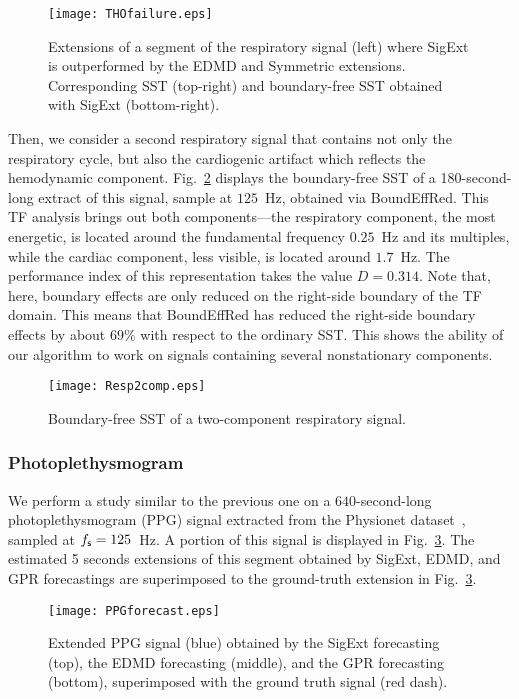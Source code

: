 \begin{figure}
\centering
\texttt{[image: THOfailure.eps]}
\caption{Extensions of a segment of the respiratory signal (left) where {\sf SigExt} is outperformed by the EDMD and Symmetric extensions. Corresponding SST (top-right) and boundary-free SST obtained with {\sf SigExt} (bottom-right).}
\label{fig:THO.failure}
\end{figure} 

{\color{red}
Then, we consider a second respiratory signal that contains not only the respiratory cycle, but also the cardiogenic artifact which reflects the hemodynamic component. Fig.~\ref{fig:resp.2} displays the boundary-free SST of a 180-second-long extract of this signal, sample at $125$~Hz, obtained via {\sf BoundEffRed}. This TF analysis brings out both components---the respiratory component, the most energetic, is located around the fundamental frequency $0.25$~Hz and its multiples, while the cardiac component, less visible, is located around $1.7$~Hz. The performance index of this representation takes the value $D=0.314$. Note that, here, boundary effects are only reduced on the right-side boundary of the TF domain. This means that {\sf BoundEffRed} has reduced the right-side boundary effects by about $69\%$ with respect to the ordinary SST. This shows the ability of our algorithm to work on signals containing several nonstationary components.

\begin{figure}
\centering
\texttt{[image: Resp2comp.eps]}
\caption{Boundary-free SST of a two-component respiratory signal.}
\label{fig:resp.2}
\end{figure} 
}

\subsubsection{Photoplethysmogram}
\label{ssse:ppg}
We perform a study similar to the previous one on a $640$-second-long photoplethysmogram (PPG) signal extracted from the Physionet dataset~\cite{Pimentel17toward, Goldberger00physiobank}, sampled at $f_{\mathsf s}=125$~Hz. A portion of this signal is displayed in Fig.~\ref{fig:ppg}. The estimated 5 seconds extensions of this segment obtained by {\sf SigExt}, EDMD, and GPR forecastings  are superimposed to the ground-truth extension in Fig.~\ref{fig:ppg}.

\begin{figure}
\texttt{[image: PPGforecast.eps]}
\caption{Extended PPG signal (blue) obtained by the {\sf SigExt} forecasting (top), the EDMD forecasting (middle), and the GPR forecasting (bottom), superimposed with the ground truth signal (red dash).}
\label{fig:ppg}
\end{figure}

